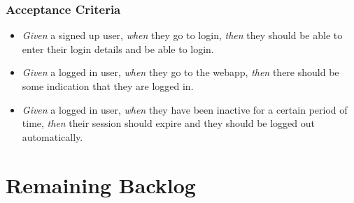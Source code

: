 \documentclass[11pt]{report}
\begin{document}
\vspace{4mm}

\subsection*{Acceptance Criteria}
\begin{itemize}
    \item \textit{Given} a signed up user, \textit{when} they go to login, \textit{then} they should be able to enter their
    login details and be able to login.
    
    \item \textit{Given} a logged in user, \textit{when} they go to the webapp, \textit{then} there should be some indication that they are logged in.
    
    \item \textit{Given} a logged in user, \textit{when} they have been inactive for a certain period of time, \textit{then} their session should expire and they should be logged out automatically.
    
\end{itemize}


\chapter{Remaining Backlog}
    
\end{document}
